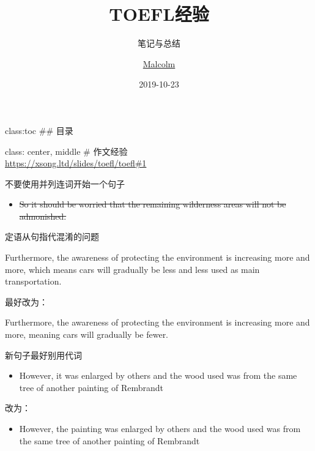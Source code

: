 \documentclass[ignorenonframetext,]{beamer}
\title{TOEFL经验}
\subtitle{笔记与总结}
\author{\href{https://xsong.ltd/}{Malcolm}}
\date{2019-10-23}
\providecommand{\tightlist}{%
  \setlength{\itemsep}{0pt}\setlength{\parskip}{0pt}}
\begin{document}
\frame{\titlepage}

\begin{frame}

class:toc \#\# 目录

\end{frame}

\begin{frame}

class: center, middle \# 作文经验\\
\url{https://xsong.ltd/slides/toefl/toefl\#1}

\begin{block}{不要使用并列连词开始一个句子}

\begin{itemize}
\tightlist
\item
  \sout{So it should be worried that the remaining wilderness areas will
  not be admonished.}
\end{itemize}

\end{block}

\end{frame}

\begin{frame}{定语从句指代混淆的问题}
\protect\hypertarget{ux5b9aux8bedux4eceux53e5ux6307ux4ee3ux6df7ux6dc6ux7684ux95eeux9898}{}

Furthermore, the awareness of protecting the environment is increasing
more and more, which means cars will gradually be less and less used as
main transportation.

最好改为：

Furthermore, the awareness of protecting the environment is increasing
more and more, meaning cars will gradually be fewer.

\end{frame}

\begin{frame}

\begin{block}{新句子最好别用代词}

\begin{itemize}
\tightlist
\item
  However, it was enlarged by others and the wood used was from the same
  tree of another painting of Rembrandt
\end{itemize}

改为：

\begin{itemize}
\tightlist
\item
  However, the painting was enlarged by others and the wood used was
  from the same tree of another painting of Rembrandt
\end{itemize}

\end{block}

\end{frame}
\end{document}
